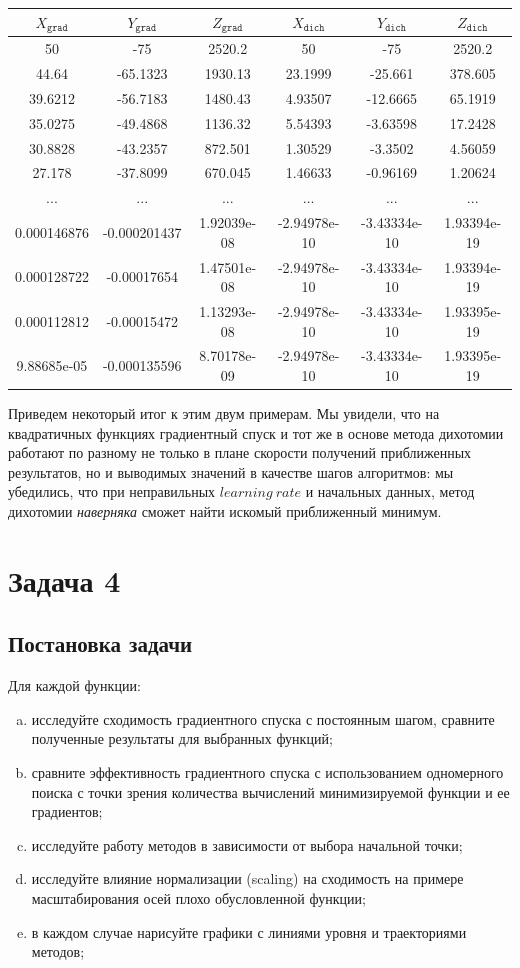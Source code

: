 \documentclass[12pt, a4paper, oneside, final]{article}
\begin{document}
	\begin{table}[H]
		\centering
		\begin{tabular}{|c|c|c|c|c|c|}
			$X_{\texttt{grad}}$ & $Y_{\texttt{grad}}$ & $Z_{\texttt{grad}}$ & $X_{\texttt{dich}}$ & $Y_{\texttt{dich}}$ & $Z_{\texttt{dich}}$ \\ \hline
			50 & -75 & 2520.2 & 50 & -75 & 2520.2 \\
			44.64 & -65.1323 & 1930.13 & 23.1999 & -25.661 & 378.605 \\
			39.6212 & -56.7183 & 1480.43 & 4.93507 & -12.6665 & 65.1919 \\
			35.0275 & -49.4868 & 1136.32 & 5.54393 & -3.63598 & 17.2428 \\
			30.8828 & -43.2357 & 872.501 & 1.30529 & -3.3502 & 4.56059 \\
			27.178 & -37.8099 & 670.045 & 1.46633 & -0.96169 & 1.20624 \\
			... & ... & ... & ... & ... & ... \\
			0.000146876 & -0.000201437 & 1.92039e-08 & -2.94978e-10 & -3.43334e-10 & 1.93394e-19 \\
			0.000128722 & -0.00017654 & 1.47501e-08 & -2.94978e-10 & -3.43334e-10 & 1.93394e-19 \\
			0.000112812 & -0.00015472 & 1.13293e-08 & -2.94978e-10 & -3.43334e-10 & 1.93395e-19 \\
			9.88685e-05 & -0.000135596 & 8.70178e-09 & -2.94978e-10 & -3.43334e-10 & 1.93395e-19
		\end{tabular}
	\end{table}
	Приведем некоторый итог к этим двум примерам. Мы увидели, что на квадратичных функциях градиентный спуск и тот же в основе метода дихотомии работают по разному не только в плане скорости получений приближенных результатов, но и выводимых значений в качестве шагов алгоритмов: мы убедились, что при неправильных $learning~rate$ и начальных данных, метод дихотомии \textit{наверняка} сможет найти искомый приближенный минимум.
	\newpage
	\section*{Задача 4}
	\subsection*{Постановка задачи}
	Для каждой функции:
	\begin{enumerate}[(a)]
		\item исследуйте сходимость градиентного спуска с постоянным шагом, сравните полученные результаты для выбранных функций;
		\item сравните эффективность градиентного спуска с использованием одномерного поиска с точки зрения количества вычислений минимизируемой функции и ее градиентов;
		\item исследуйте работу методов в зависимости от выбора начальной точки;
		\item исследуйте влияние нормализации (scaling) на сходимость на примере масштабирования осей плохо обусловленной функции;
		\item в каждом случае нарисуйте графики с линиями уровня и траекториями методов;
	\end{enumerate}
\end{document}
